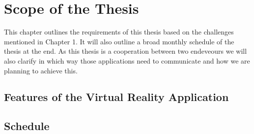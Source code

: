 \documentclass[twoside, parskip]{VRThesis} %
\begin{document}
%

\chapter{Scope of the Thesis}

This chapter outlines the requirements of this thesis based on the challenges mentioned in Chapter 1.
It will also outline a broad monthly schedule of the thesis at the end.
As this thesis is a cooperation between two endeveours we will also clarify in which way those applications need to communicate and how we are planning to achieve this.

\section{\label{sec::Features}Features of the Virtual Reality Application}


\section{Schedule}


 

\end{document}
